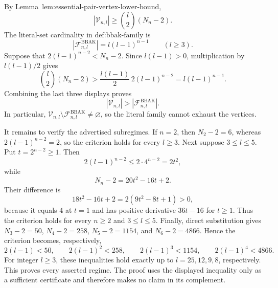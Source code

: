 By Lemma~\(\text{lem:essential-pair-vertex-lower-bound}\),
\[
|\mathcal V_{n,l}|\ge \binom{l}{2}(N_n-2).
\]
The literal-set cardinality in \(\text{def:bbak-family}\) is
\[
|\mathcal F^{\mathrm{BBAK}}_{n,l}|=l(l-1)^{n-1}\qquad(l\ge3).
\]
Suppose that \(2(l-1)^{n-2}<N_n-2\). Since \(l(l-1)>0\), multiplication by \(l(l-1)/2\) gives
\[
\binom{l}{2}(N_n-2)>\frac{l(l-1)}{2}\,2(l-1)^{n-2}=l(l-1)^{n-1}.
\]
Combining the last three displays proves
\[
|\mathcal V_{n,l}|>|\mathcal F^{\mathrm{BBAK}}_{n,l}|.
\]
In particular, \(\mathcal V_{n,l}\setminus\mathcal F^{\mathrm{BBAK}}_{n,l}\neq\varnothing\), so the literal family cannot exhaust the vertices.

It remains to verify the advertised subregimes. If \(n=2\), then \(N_2-2=6\), whereas \(2(l-1)^{n-2}=2\), so the criterion holds for every \(l\ge3\). Next suppose \(3\le l\le5\). Put \(t=2^{n-2}\ge1\). Then
\[
2(l-1)^{n-2}\le2\cdot4^{n-2}=2t^2,
\]
while
\[
N_n-2=20t^2-16t+2.
\]
Their difference is
\[
18t^2-16t+2=2(9t^2-8t+1)>0,
\]
because it equals \(4\) at \(t=1\) and has positive derivative \(36t-16\) for \(t\ge1\). Thus the criterion holds for every \(n\ge2\) and \(3\le l\le5\). Finally, direct substitution gives \(N_3-2=50\), \(N_4-2=258\), \(N_5-2=1154\), and \(N_6-2=4866\). Hence the criterion becomes, respectively,
\[
2(l-1)<50,\qquad 2(l-1)^2<258,\qquad 2(l-1)^3<1154,\qquad 2(l-1)^4<4866.
\]
For integer \(l\ge3\), these inequalities hold exactly up to \(l=25,12,9,8\), respectively. This proves every asserted regime. The proof uses the displayed inequality only as a sufficient certificate and therefore makes no claim in its complement.